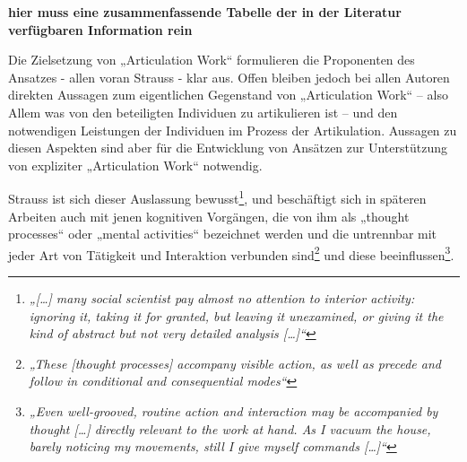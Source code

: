 \textbf{hier muss eine zusammenfassende Tabelle der in der Literatur verfügbaren Information rein}

Die Zielsetzung von „Articulation Work“ formulieren die Proponenten des Ansatzes - allen voran Strauss - klar aus. Offen bleiben jedoch bei allen Autoren direkten Aussagen zum eigentlichen Gegenstand von „Articulation Work“ – also Allem was von den beteiligten Individuen zu artikulieren ist – und den notwendigen Leistungen der Individuen im Prozess der Artikulation. Aussagen zu diesen Aspekten sind aber für die Entwicklung von Ansätzen zur Unterstützung von expliziter „Articulation Work“ notwendig. 

Strauss ist sich dieser Auslassung bewusst\footnote{\emph{„[\ldots] many social scientist pay almost no attention to interior activity: ignoring it, taking it for granted, but leaving it unexamined, or giving it the kind of abstract but not very detailed analysis [\ldots]“}\citep[][S. 131]{Strauss93}}, und beschäftigt sich in späteren Arbeiten \citep{Strauss93} auch mit jenen kognitiven Vorgängen, die von ihm als „thought processes“ oder „mental activities“ bezeichnet werden und die untrennbar mit jeder Art von Tätigkeit und Interaktion verbunden sind\footnote{\emph{„These [thought processes] accompany visible action, as well as precede and follow in conditional and consequential modes“}\citep[][S. 146]{Strauss93}} und diese beeinflussen\footnote{\emph{„Even well-grooved, routine action and interaction may be accompanied by thought [\ldots] directly relevant to the work at hand. As I vacuum the house, barely noticing my movements, still I give myself commands [\ldots]“}\citep[][S. 132]{Strauss93}}. 

